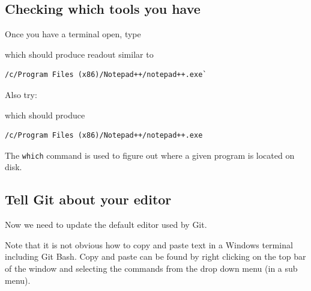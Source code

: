 \subsection{Checking which tools you
have}\label{checking-which-tools-you-have}

Once you have a terminal open, type

\begin{Shaded}
\begin{Highlighting}[]
 
\end{Highlighting}
\end{Shaded}

which should produce readout similar to

\begin{verbatim}
/c/Program Files (x86)/Notepad++/notepad++.exe`
\end{verbatim}

Also try:

\begin{Shaded}
\begin{Highlighting}[]
 
\end{Highlighting}
\end{Shaded}

which should produce

\begin{verbatim}
/c/Program Files (x86)/Notepad++/notepad++.exe
\end{verbatim}

The \texttt{which} command is used to figure out where a given program
is located on disk.

\subsection{Tell Git about your
editor}\label{tell-git-about-your-editor}

Now we need to update the default editor used by Git.

\begin{Shaded}
\begin{Highlighting}[]
 
\end{Highlighting}
\end{Shaded}

Note that it is not obvious how to copy and paste text in a Windows
terminal including Git Bash. Copy and paste can be found by right
clicking on the top bar of the window and selecting the commands from
the drop down menu (in a sub menu).

